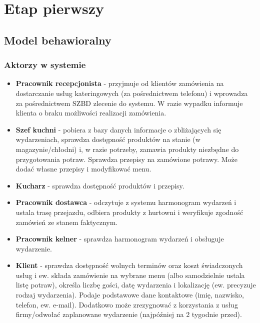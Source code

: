 \documentclass[10pt,a4paper]{article}
\begin{document}
\pagebreak

\section{Etap pierwszy}

\subsection{Model behawioralny}

\subsubsection{Aktorzy w systemie}
\begin{itemize}
    \item \textbf{Pracownik recepcjonista} - przyjmuje od klientów zamówienia na dostarczanie usług kateringowych (za pośrednictwem telefonu) i wprowadza za pośrednictwem SZBD zlecenie do systemu. W razie wypadku informuje klienta o braku możliwości realizacji zamówienia.
    \item \textbf{Szef kuchni} - pobiera z bazy danych informacje o zbliżających się wydarzeniach, sprawdza dostępność produktów na stanie (w magazynie/chłodni) i, w razie potrzeby, zamawia produkty niezbędne do przygotowania potraw. Sprawdza przepisy na zamówione potrawy. Może dodać własne przepisy i modyfikować menu.
    \item \textbf{Kucharz} - sprawdza dostępność produktów i przepisy.
    \item \textbf{Pracownik dostawca} - odczytuje z systemu harmonogram wydarzeń i ustala trasę przejazdu, odbiera produkty z hurtowni i weryfikuje zgodność zamówień ze stanem faktycznym.
    \item \textbf{Pracownik kelner} - sprawdza harmonogram wydarzeń i obsługuje wydarzenie.
    \item \textbf{Klient} - sprawdza dostępność wolnych terminów oraz koszt świadczonych usług i ew. składa zamówienie na wybrane menu (albo samodzielnie ustala listę potraw), określa liczbę gości, datę wydarzenia i lokalizację (ew. precyzuje rodzaj wydarzenia). Podaje podstawowe dane kontaktowe (imię, nazwisko, telefon, ew. e-mail). Dodatkowo może zrezygnować z korzystania z usług firmy/odwołać zaplanowane wydarzenie (najpóźniej na 2 tygodnie przed).
\end{itemize}
\end{document}
